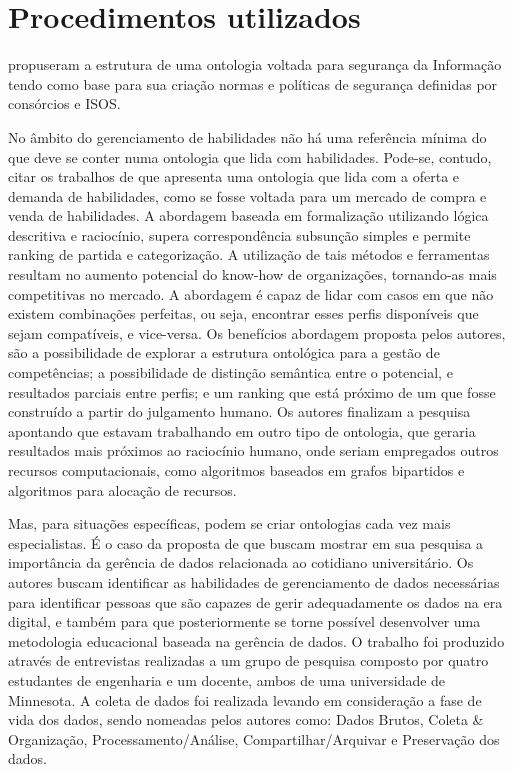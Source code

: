 \documentclass[hyphens,11pt,a4paper]{article}
\begin{document}
\section{Procedimentos utilizados}

 propuseram a estrutura de uma ontologia voltada para segurança da Informação tendo como base para sua criação normas e políticas de segurança definidas por consórcios e ISOS.

No âmbito do gerenciamento de habilidades não há uma referência mínima do que deve se conter numa ontologia que lida com habilidades. Pode-se, contudo, citar os trabalhos de \cite{Colucci:jucs_9_12:a_formal_approach_to}
que apresenta uma ontologia que lida com a oferta e demanda de habilidades, como se fosse voltada para um mercado de compra e venda de habilidades. A abordagem baseada em formalização utilizando lógica descritiva e raciocínio, supera correspondência subsunção simples e permite ranking de partida e categorização. A utilização de tais métodos e ferramentas resultam no aumento potencial do know-how de organizações, tornando-as mais competitivas no mercado. A abordagem é capaz de lidar com casos em que não existem combinações perfeitas, ou seja, encontrar esses perfis disponíveis que sejam compatíveis, e vice-versa. Os benefícios abordagem proposta pelos autores, são a possibilidade de explorar a estrutura ontológica para a gestão de competências; a possibilidade de distinção semântica entre o potencial, e resultados parciais entre perfis; e um ranking que está próximo de um que fosse construído a partir do julgamento humano. Os autores finalizam a pesquisa apontando que estavam trabalhando em outro tipo de ontologia, que geraria resultados mais próximos ao raciocínio humano, onde seriam empregados outros recursos computacionais, como algoritmos baseados em grafos bipartidos e algoritmos para alocação de recursos.


Mas, para situações específicas, podem se criar ontologias cada vez mais especialistas. É o caso da proposta de \cite{johnston2013} que buscam mostrar em sua pesquisa a importância da gerência de dados relacionada ao cotidiano universitário. Os autores buscam identificar as habilidades de gerenciamento de dados necessárias para identificar pessoas que são capazes de gerir adequadamente os dados na era digital, e também para que posteriormente se torne possível desenvolver uma metodologia educacional baseada na gerência de dados.  O trabalho foi produzido através de entrevistas realizadas a um grupo de pesquisa composto por quatro estudantes de engenharia e um docente, ambos de uma universidade de Minnesota. A coleta de dados foi realizada levando em consideração a fase de vida dos dados, sendo nomeadas pelos autores como: Dados Brutos, Coleta \& Organização, Processamento/Análise, Compartilhar/Arquivar e Preservação dos dados.
\end{document}
